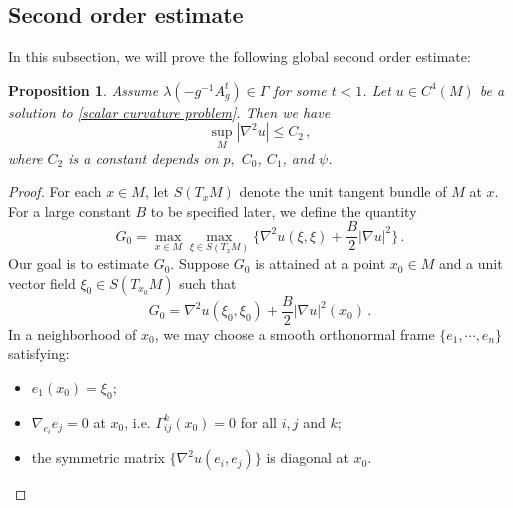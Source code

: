 \documentclass{article}
\theoremstyle{plain}
\newtheorem{proposition}[theorem]{Proposition}
\theoremstyle{definition}
\theoremstyle{definition}
\numberwithin{equation}{section}
\begin{document}
\begin{sloppypar}
\subsection{Second order estimate}\label{Second order estimate}
In this subsection, we will prove the following global second order estimate:
\begin{proposition}\label{int hessian estimate}
Assume  $\lambda(-g^{-1}A_{g}^{t})\in \Gamma$ for some $t<1$. Let $u\in C^{4}(M)$ be a solution to  \eqref{scalar curvature problem}. Then we have
\begin{equation*} 
\sup_{M}|\nabla^2u|\leq C_{2}\,,
\end{equation*}
where $C_{2}$ is a constant depends on $p,$  $C_{0}$, $C_{1}$, and  $ \psi$.
\end{proposition}

\begin{proof}
For each $x\in M$, let $S(T_{x}M)$ denote the unit tangent bundle of $M$ at $x$. For a large constant $B$ to be specified later, we define the quantity
\begin{equation*}
G_{0}=\max_{x\in M}\max_{\xi\in S(T_{x}M)}\bigg\{\nabla^2 u(\xi,\xi)+\frac{B}{2}|\nabla u|^{2}\bigg\}\,.
\end{equation*}
Our goal is to estimate $G_0$. Suppose $G_0$ is attained at a point $x_0 \in M$ and a unit vector field $\xi_0 \in S(T_{x_0} M)$ such that
\[
G_{0}=\nabla^2 u(\xi_{0},\xi_{0})+\frac{B}{2}|\nabla u|^{2}(x_{0})\,.
\]
In a neighborhood of $x_0$, we may choose a smooth orthonormal frame $\{e_1, \cdots, e_n\}$ satisfying:
\begin{itemize}\itemsep0.5em
\item[(i)] $e_{1}(x_0)=\xi_{0}$;
\item[(ii)] $\nabla_{e_i}e_j=0$ at $x_0$, i.e. $\Gamma_{ij}^k(x_0)=0$ for all $i,j$ and $k$;
\item[(iii)] the symmetric matrix $\{\nabla^2u(e_{i},e_{j})\}$ is diagonal at $x_0$.
\end{itemize}


\end{proof}
\end{sloppypar}
\end{document}
